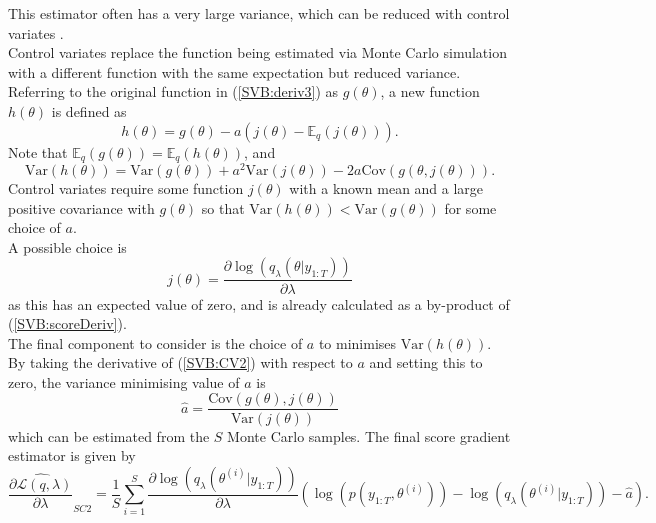 \documentclass[
12pt, %
onehalfspacing, %
nohyperref, %
headsepline, %
chapterinoneline, %
]{MastersDoctoralThesis} %
\begin{document}
This estimator often has a very large variance, which can be reduced with control variates \citep{Ross2002}. 
\\

Control variates replace the function being estimated via Monte Carlo simulation with a different function with the same expectation but reduced variance. Referring to the original function in (\ref{SVB:deriv3}) as $g(\theta)$, a new function $h(\theta)$ is defined as
\begin{equation}
\label{SVB:CV1}
h(\theta) = g(\theta) - a(j(\theta) - \mathbb{E}_q(j(\theta))).
\end{equation}
Note that $\mathbb{E}_q(g(\theta)) = \mathbb{E}_q(h(\theta))$, and 
\begin{equation}
\label{SVB:CV2}
\mbox{Var}(h(\theta)) = \mbox{Var}(g(\theta)) + a^2 \mbox{Var}(j(\theta)) - 2 a \mbox{Cov}(g(\theta, j(\theta))).
\end{equation}
Control variates require some function $j(\theta)$ with a known mean and a large positive covariance with $g(\theta)$ so that $\mbox{Var}(h(\theta)) < \mbox{Var}(g(\theta))$ for some choice of $a$.
\\

A possible choice is 
\begin{equation}
\label{SVB:CV3}
j(\theta) = \frac{\partial \log(q_{\lambda}(\theta | y_{1:T}))}{\partial \lambda}
\end{equation}
as this has an expected value of zero, and is already calculated as a by-product of (\ref{SVB:scoreDeriv}).
\\

The final component to consider is the choice of $a$ to minimises $\mbox{Var}(h(\theta))$.  By taking the derivative of (\ref{SVB:CV2}) with respect to $a$ and setting this to zero, the variance minimising value of $a$ is
\begin{equation}
\label{SVB:CV4}
\hat{a} = \frac{\mbox{Cov}(g(\theta), j(\theta))}{\mbox{Var}(j(\theta))}
\end{equation}
which can be estimated from the $S$ Monte Carlo samples. The final score gradient estimator is given by
\begin{equation}
\label{SVB:scoreDeriv2}
\widehat{\frac{\partial\mathcal{L}(q, \lambda)}{\partial \lambda}}_{SC2} = \frac{1}{S} \sum_{i = 1}^S \frac{\partial \log(q_{\lambda}(\theta^{(i)} | y_{1:T}))}{\partial \lambda} \left(\log(p(y_{1:T}, \theta^{(i)})) - \log(q_{\lambda}(\theta^{(i)} | y_{1:T})) - \hat{a} \right).
\end{equation}
\end{document}
